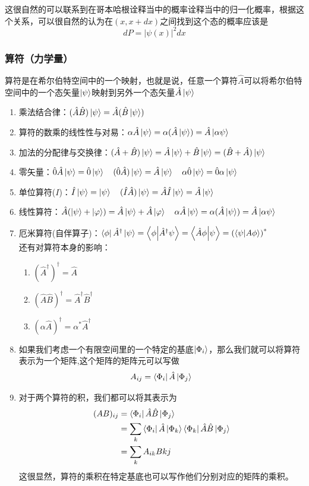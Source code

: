 \documentclass{article}
\newcommand{\h}[1]{\hat{#1}}
\begin{document}
这很自然的可以联系到在哥本哈根诠释当中的概率诠释当中的归一化概率，根据这个关系，可以很自然的认为在$(x,x+dx)$之间找到这个态的概率应该是
\[dP = |\psi(x)|^2dx\]

\subsubsection{算符（力学量）}
算符是在希尔伯特空间中的一个映射，也就是说，任意一个算符$\hat{A}$可以将希尔伯特空间中的一个态矢量$\ket{\psi}$映射到另外一个态矢量$\hat{A}\ket{\psi}$
\begin{enumerate}
	\item 乘法结合律：$(\hat{A}\hat{B})\ket{\psi}=\hat{A}(\hat{B}\ket{\psi})$
	\item 算符的数乘的线性性与对易：$\alpha\hat{A}\ket{\psi}=\alpha(\hat{A}\ket{\psi})=\hat{A}\ket{\alpha\psi}$
	\item 加法的分配律与交换律：$(\hat{A}+\hat{B})\ket{\psi}=\hat{A}\ket{\psi}+\hat{B}\ket{\psi}=(\hat{B}+\hat{A})\ket{\psi}$
	\item 零矢量：$\hat{0}\hat{A}\ket{\psi}=\hat{0}\ket{\psi}\quad(\hat{0}\hat{A})\ket{\psi}=\hat{A}\ket{\psi}\quad\alpha\hat{0}\ket{\psi}=\hat{0}\alpha\ket{\psi}$
	\item 单位算符($I$)：$\hat{I}\ket{\psi}=\ket{\psi}\quad(\hat{I}\hat{A})\ket{\psi}=\hat{A}\hat{I}\ket{\psi}=\hat{A}\ket{\psi}$
	\item 线性算符：$\hat{A}(\ket{\psi}+\ket{\varphi})=\hat{A}\ket{\psi}+\hat{A}\ket{\varphi}\quad\alpha\hat{A}\ket{\psi}=\alpha(\hat{A}\ket{\psi})=\hat{A}\ket{\alpha\psi}$
	\item 厄米算符(自伴算子)：$\bra{\phi}\hat{A}^\dagger\ket{\psi}=\braket{\phi}{\hat{A}^\dagger\psi}=\braket{\hat{A}\phi}{\psi}=\left(\braket{\psi}{A\phi}\right)^*$\\
	      还有对算符本身的影响：
	      \begin{enumerate}
		      \item $(\hat{A}^\dagger)^\dagger=\hat{A}$
		      \item $(\hat{A}\hat{B})^\dagger=\h{A}^\dagger\h{B}^\dagger$
		      \item $(\alpha\h{A})^\dagger=\alpha^*\h{A}^\dagger$
	      \end{enumerate}
	\item 如果我们考虑一个有限空间里的一个特定的基底$\ket{\Phi_i}$，那么我们就可以将算符表示为一个矩阵,这个矩阵的矩阵元可以写做
	      \[A_{ij}=\bra{\Phi_i}\h{A}\ket{\Phi_j}\]
	\item 对于两个算符的积，我们都可以将其表示为
	      \begin{align*}
		      (AB)_{ij} & =\bra{\Phi_i}\h{A}\h{B}\ket{\Phi_j}                                    \\
		                & =\sum_k\bra{\Phi_i}\h{A}\ket{\Phi_k}\bra{\Phi_k}\h{A}\h{B}\ket{\Phi_j} \\
		                & =\sum_kA_{ik}B{kj}
	      \end{align*}
	      这很显然，算符的乘积在特定基底也可以写作他们分别对应的矩阵的乘积。


\end{enumerate}
\end{document}

